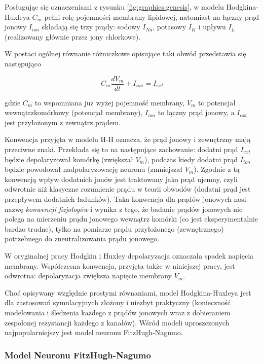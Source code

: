   Posługując się oznaczeniami z rysunku \ref{fig:graphics:genesis}, w modelu Hodgkina-Huxleya $C_{m}$ pełni rolę pojemności membrany lipidowej, natomiast na łączny prąd jonowy $I_{ion}$ składają się trzy prądy: sodowy $I_{Na}$, potasowy $I_{K}$ i upływu $I_{L}$ (realizowany głównie przez jony chlorkowe).

  W postaci ogólnej równanie różniczkowe opisujące taki obwód przedstawia się następująco

  \begin{equation} \label{hh:1}
    C_{m} \frac{dV_{m}}{dt} + I_{ion} = I_{ext}
  \end{equation}

  gdzie $C_{m}$ to wspomniana już wyżej pojemność membrany, $V_{m}$ to potencjał wewnątrzkomórkowy (potencjał membrany), $I_{ion}$ to łączny prąd jonowy, a $I_{ext}$ jest przyłożonym z zewnątrz prądem.

  Konwencja przyjęta w modelu H-H oznacza, że prąd jonowy i zewnętrzny mają przeciwne znaki. Przekłada się to na następujące zachowanie: dodatni prąd $I_{ext}$ będzie depolaryzował komórkę (zwiększał $V_{m}$), podczas kiedy dodatni prąd $I_{ion}$ będzie powodował nadpolaryzowację neuronu (zmniejszał $V_{m}$). Zgodnie z tą konwencją wpływ dodatnich jonów jest traktowany jako prąd ujemny, czyli odwrotnie niż klasyczne rozumienie prądu w teorii obwodów (dodatni prąd jest przepływem dodatnich ładunków). Taka konwencja dla prądów jonowych nosi nazwę \emph{konwencji fizjologów} i wynika z tego, że badanie prądów jonowych nie polega na mierzeniu prądu jonowego wewnątrz komórki (co jest eksperymentalnie bardzo trudne), tylko na pomiarze prądu przyłożonego (zewnętrznego) potrzebnego do zneutralizowania prądu jonowego.

  W oryginalnej pracy Hodgkin i Huxley depolaryzacja oznaczała spadek napięcia membrany. Współczesna konwencja, przyjęta także w niniejszej pracy, jest odwrotna: depolaryzacja zwiększa napięcie membrany $V_{m}$.

  Choć opisywany względnie prostymi równaniami, model Hodgkina-Huxleya jest dla zastosowań symulacyjnych złożony i niezbyt praktyczny (konieczność modelowania i śledzenia każdego z prądów jonowych wraz z dobieraniem zespolonej rezystancji każdego z kanałów). Wśród modeli uproszczonych najpopularniejszy jest model neuronu FitzHugh-Nagumo.


  \subsubsection{Model Neuronu FitzHugh-Nagumo}

